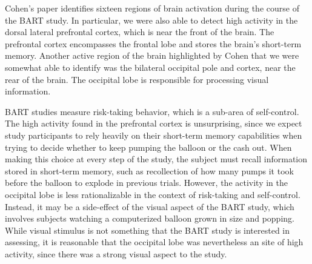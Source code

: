 \par \indent Cohen's paper identifies sixteen regions of brain activation 
during the course of the BART study. In particular, we were also able to detect 
high activity in the dorsal lateral prefrontal cortex, which is near the front 
of the brain. The prefrontal cortex encompasses the frontal lobe and stores 
the brain's short-term memory. Another active region of the brain highlighted 
by Cohen that we were somewhat able to identify was the bilateral occipital 
pole and cortex, near the rear of the brain. The occipital lobe is responsible 
for processing visual information. 

\par BART studies measure risk-taking behavior, which is a sub-area of 
self-control. The high activity found in the prefrontal cortex is 
unsurprising, since we expect study participants to rely heavily on their 
short-term memory capabilities when trying to decide whether to keep pumping 
the balloon or the cash out. When making this choice at every step of the 
study, the subject must recall information stored in short-term memory, such 
as recollection of how many pumps it took before the balloon to explode in 
previous trials. However, the activity in the occipital lobe is less 
rationalizable in the context of risk-taking and self-control. Instead, it may 
be a side-effect of the visual aspect of the BART study, which involves 
subjects watching a computerized balloon grown in size and popping. While 
visual stimulus is not something that the BART study is interested in 
assessing, it is reasonable that the occipital lobe was nevertheless an site 
of high activity, since there was a strong visual aspect to the study. 
 
